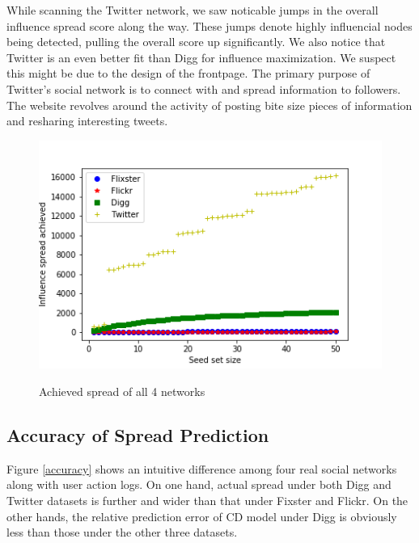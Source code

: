 \documentclass{acm_proc_article-sp}
\begin{document}
While scanning the Twitter network, we saw noticable jumps in the overall influence spread score along the way. These jumps denote highly influencial nodes being detected, pulling the overall score up significantly. We also notice that Twitter is an even better fit than Digg for influence maximization. We suspect this might be due to the design of the frontpage. The primary purpose of Twitter's social network is to connect with and spread information to followers. The website revolves around the activity of posting bite size pieces of information and resharing interesting tweets.

\begin{figure}[h]
	\includegraphics[width=\linewidth]{spread4.png}
	\centering
	\label{spreadall}
    \caption{Achieved spread of all 4 networks}
\end{figure}

\subsection*{Accuracy of Spread Prediction}

Figure \ref{accuracy} shows an intuitive difference among four real social networks along with user action logs. On one hand, actual spread under both Digg and Twitter datasets is further and wider than that under Fixster and Flickr. On the other hands, the relative prediction error of CD model under Digg is obviously less than those under the other three datasets.
\end{document}
